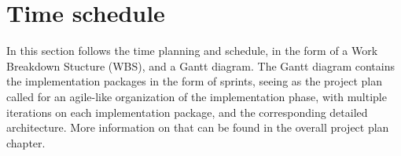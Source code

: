 \section{Time schedule}
In this section follows the time planning and schedule, in the form of a Work Breakdown Stucture (WBS), and a Gantt diagram.
The Gantt diagram contains the implementation packages in the form of sprints, seeing as the project plan called for an agile-like organization of the implementation phase, with multiple iterations on each implementation package, and the corresponding detailed architecture. More information on that can be found in the overall project plan chapter.
 
